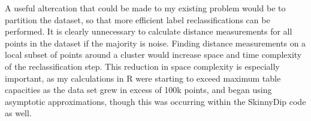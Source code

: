 \documentclass{sig-alternate-05-2015}
\begin{document}
A useful altercation that could be made to my existing problem would be to partition the dataset, so that more efficient label reclassifications can be performed. It is clearly unnecessary to calculate distance measurements for all points in the dataset if the majority is noise. Finding distance measurements on a local subset of points around a cluster would increase space and time complexity of the reclassification step. This reduction in space complexity is especially important, as my calculations in R were starting to exceed maximum table capacities as the data set grew in excess of 100k points, and began using asymptotic approximations, though this was occurring within the SkinnyDip code as well.






\end{document}
